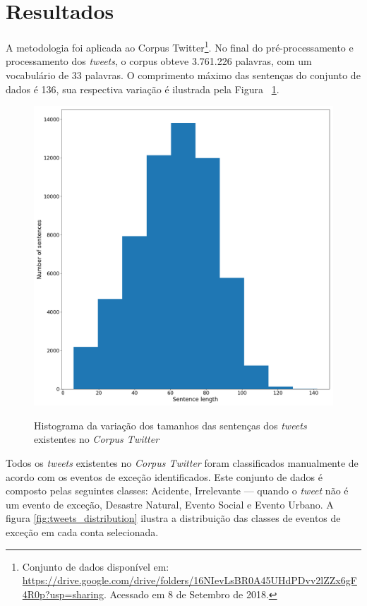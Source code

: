 \documentclass[
	12pt,				%
	oneside,			%
	a4paper,			%
	english,			%
	brazil				%
	]{abntex2ppgsi}
\begin{document}
\section{Resultados}
	
A metodologia foi aplicada ao Corpus Twitter\footnote{Conjunto de dados disponível em: \url{https://drive.google.com/drive/folders/16NIevLsBR0A45UHdPDvv2lZZx6gF4R0p?usp=sharing}. Acessado em 8 de Setembro de 2018.}. No final do pré-processamento e processamento dos \textit{tweets}, o corpus obteve 3.761.226 palavras, com um vocabulário de 33 palavras. O comprimento máximo das sentenças do conjunto de dados é 136, sua respectiva variação é ilustrada pela Figura ~\ref{fig:corpus_metrics}.
 
\begin{figure}[!htb]
	\centering
 	  \caption{Histograma da variação dos tamanhos das sentenças dos \textit{tweets} existentes no \textit{Corpus Twitter}}
		\includegraphics[width=1\linewidth]{images/corpus_metrics.png}
	\label{fig:corpus_metrics}
\end{figure}

Todos os \textit{tweets} existentes no \textit{Corpus Twitter} foram classificados manualmente de acordo com os eventos de exceção identificados. Este conjunto de dados é composto pelas seguintes classes: Acidente, Irrelevante --- quando o \textit{tweet} não é um evento de exceção, Desastre Natural, Evento Social e Evento Urbano. A figura \ref{fig:tweets_distribution} ilustra a distribuição das classes de eventos de exceção em cada conta selecionada.
\end{document}
